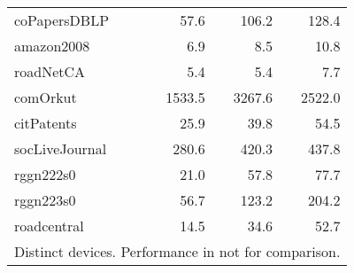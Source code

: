 \begin{table}[tbp]
\begin{center}
\begin{tabular}{|l|r|r|r|}
    \rowcolor{black!2 } coPapersDBLP&57.6&106.2&128.4\\
    \rowcolor{black!10} amazon2008&6.9&8.5&10.8\\
    \rowcolor{black!2 } roadNetCA&5.4&5.4&7.7\\
    \rowcolor{black!10} comOrkut&1533.5&3267.6&2522.0\\
    \rowcolor{black!2 } citPatents&25.9&39.8&54.5\\
    \rowcolor{black!10} socLiveJournal&280.6&420.3&437.8\\
    \rowcolor{black!2 } rggn222s0&21.0&57.8&77.7\\
    \rowcolor{black!10} rggn223s0&56.7&123.2&204.2\\
    \rowcolor{black!2 } roadcentral&14.5&34.6&52.7\\
    \hline
    \hline
    \multicolumn{4}{l}{Distinct devices. Performance in not for comparison.} \\
    \end{tabular}
    \label{rq2_table}
\end{center}
\end{table}

